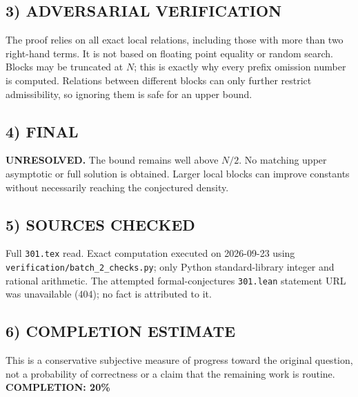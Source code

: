 \subsection{3) ADVERSARIAL VERIFICATION}
The proof relies on all exact local relations, including those with more than two right-hand terms. It is not based on floating point equality or random search. Blocks may be truncated at $N$; this is exactly why every prefix omission number is computed. Relations between different blocks can only further restrict admissibility, so ignoring them is safe for an upper bound.
\subsection{4) FINAL}
\textbf{UNRESOLVED.}
The bound remains well above $N/2$. No matching upper asymptotic or full solution is obtained. Larger local blocks can improve constants without necessarily reaching the conjectured density.
\subsection{5) SOURCES CHECKED}
Full \texttt{301.tex} read. Exact computation executed on 2026-09-23 using \texttt{verification/batch\_2\_checks.py}; only Python standard-library integer and rational arithmetic. The attempted formal-conjectures \texttt{301.lean} statement URL was unavailable (404); no fact is attributed to it.
\subsection{6) COMPLETION ESTIMATE}
This is a conservative subjective measure of progress toward the original question, not a probability of correctness or a claim that the remaining work is routine.
\textbf{COMPLETION: 20\%}
